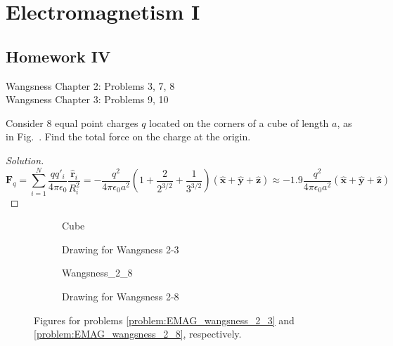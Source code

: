 \documentclass[crop=false,class=article,oneside]{standalone}
\begin{document}
    \ifx\ifphysicscourseselectromagnetismI\undefined
        \section*{Electromagnetism I}
        \setcounter{section}{4}
        \renewcommand\thesubfigure{%
            \arabic{section}.\arabic{figure}.\arabic{subfigure}%
        }
    \fi    
    \subsection{Homework IV}
    Wangsness Chapter 2: Problems 3, 7, 8\\
    Wangsness Chapter 3: Problems 9, 10
    \begin{problem}[Wangsness 2-3]
        \label{problem:EMAG_wangsness_2_3}
        Consider $8$ equal point charges $q$ located on
        the corners of a cube of length $a$, as in
        Fig.~.
        Find the total force on the charge at the origin.
    \end{problem}
    \begin{proof}[Solution]
        \begin{equation*}
            \mathbf{F}_q=
            \sum_{i=1}^{N}\frac{qq'_{i}}{4\pi\epsilon_0}
            \frac{\hat{\mathbf{r}}_{i}}{R_{i}^{2}}
            =-\frac{q^{2}}{4\pi \epsilon_0 a^{2}}
            (1+\frac{2}{2^{3/2}}+\frac{1}{3^{3/2}})
            (\hat{\mathbf{x}}+\hat{\mathbf{y}}
            +\hat{\mathbf{z}})
            \approx-1.9\frac{q^{2}}{4\pi\epsilon_{0}a^{2}}
            (\hat{\mathbf{x}}
            +\hat{\mathbf{y}}
            +\hat{\mathbf{z}})
        \end{equation*}
    \end{proof}
    \begin{figure}[H]
        \centering
        \captionsetup{type=figure}
        \begin{subfigure}[b]{0.49\textwidth}
            \centering
            \captionsetup{type=figure}
            {Cube}
            \caption{Drawing for Wangsness 2-3}
            \label{fig:EMAG_1_Wangsness_2_3}
        \end{subfigure}
        \begin{subfigure}[b]{0.49\textwidth}
            \centering
            \captionsetup{type=figure}
            {Wangsness_2_8}
            \caption{Drawing for Wangsness 2-8}
            \label{fig:EMAG_1_wangsness_2_8}
        \end{subfigure}
        \caption[Figures for Wangsness 2-3 and 2-8]{%
            Figures for problems \ref{problem:EMAG_wangsness_2_3}
            and \ref{problem:EMAG_wangsness_2_8}, respectively.
        }
    \end{figure}
\end{document}
